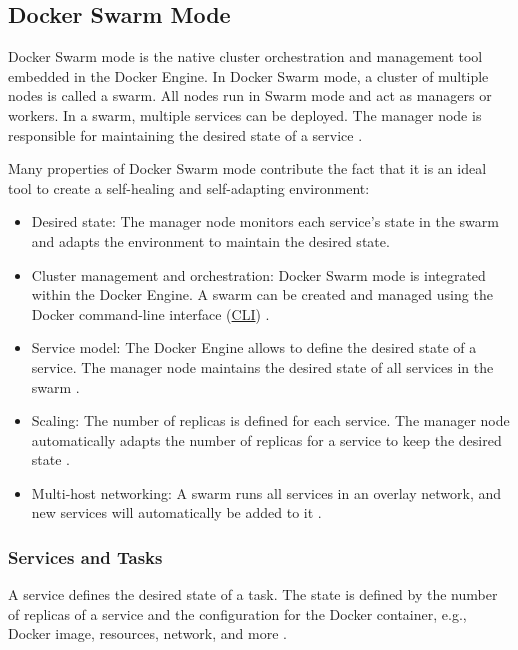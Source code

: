 \subsection{Docker Swarm Mode}
\label{subsec:04_docker_swarm}
Docker Swarm mode is the native cluster orchestration and management tool embedded in the Docker Engine.
In Docker Swarm mode, a cluster of multiple nodes is called a swarm. All nodes run in Swarm mode and act as managers or workers.
In a swarm, multiple services can be deployed. The manager node is responsible for maintaining the desired state of a service \cite{Docker2020Docs}.


% 
Many properties of Docker Swarm mode contribute the fact that it is an ideal tool to create a self-healing and self-adapting environment:
\begin{itemize}
\item Desired state: The manager node monitors each service's state in the swarm and adapts the environment to maintain the desired state\cite{Docker2020Docs}.

\item Cluster management and orchestration: Docker Swarm mode is integrated within the Docker Engine. A swarm can be created and managed using the Docker command-line interface (\hyperlink{abbr:cli}{CLI}) \cite{Docker2020Docs}.

\item Service model: The Docker Engine allows to define the desired state of a service. The manager node maintains the desired state of all services in the swarm \cite{Docker2020Docs}.

\item Scaling: The number of replicas is defined for each service. The manager node automatically adapts the number of replicas for a service to keep the desired state \cite{Docker2020Docs}.

\item Multi-host networking: A swarm runs all services in an overlay network, and new services will automatically be added to it \cite{Docker2020Docs}.
\end{itemize}


\subsubsection{Services and Tasks}
A service defines the desired state of a task. The state is defined by the number of replicas of a service and the configuration for the Docker container, e.g., Docker image, resources, network, and more \cite{Docker2020Docs}.


